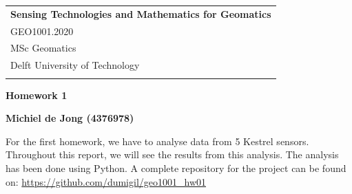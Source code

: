 \documentclass[a4paper,12pt]{article} %
\begin{document}



\thispagestyle{empty} %

\begin{tabular}{p{15.5cm}} %
{\large \bf Sensing Technologies and Mathematics for Geomatics} \\
GEO1001.2020 \\ MSc Geomatics \\ Delft University of Technology \\
\hline %
\\
\end{tabular} %

\vspace*{0.3cm} %

\begin{center} %
	{\Large \bf Homework 1} %
	\vspace{2mm}
	
	{\bf Michiel de Jong (4376978)} %
		
\end{center}  

\vspace{0.4cm}


For the first homework, we have to analyse data \cite{Maiullari2020} from 5 Kestrel sensors. Throughout this report, we will see the results from this analysis. The analysis has been done using Python. A complete repository for the project can be found on: \url{https://github.com/dumigil/geo1001_hw01 }
\end{document}
